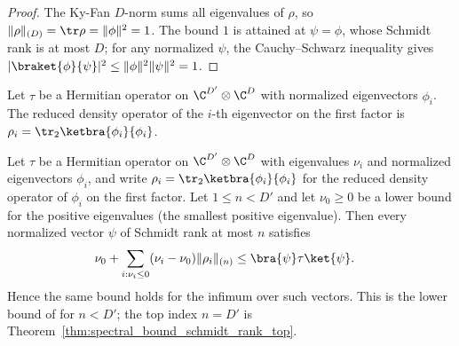 \begin{proof}
    \leanok
    The Ky-Fan $D$-norm sums all eigenvalues of $\rho$, so
    $\|\rho\|_{(D)}=\tr\rho=\|\phi\|^2=1$. The bound $1$ is attained at
    $\psi=\phi$, whose Schmidt rank is at most $D$; for any normalized
    $\psi$, the Cauchy--Schwarz inequality gives
    $|\braket{\phi}{\psi}|^2\le\|\phi\|^2\|\psi\|^2=1$.
\end{proof}

\begin{definition}
    \label{def:reduced_eig_density}
    \leanok
    Let $\tau$ be a Hermitian operator on
    $\C^{D'}\otimes\C^{D}$ with normalized eigenvectors $\phi_i$. The reduced
    density operator of the $i$-th eigenvector on the first factor is
    $\rho_i=\tr_2\ketbra{\phi_i}{\phi_i}$.
\end{definition}

\begin{theorem}
    \label{thm:spectral_lower_bound_schmidt_rank}
    \leanok
    Let $\tau$ be a Hermitian operator on $\C^{D'}\otimes\C^{D}$ with
    eigenvalues $\nu_i$ and normalized eigenvectors $\phi_i$, and write
    $\rho_i=\tr_2\ketbra{\phi_i}{\phi_i}$ for the reduced density operator of
    $\phi_i$ on the first factor. Let $1\le n<D'$ and let $\nu_0\ge 0$ be a
    lower bound for the positive eigenvalues (the smallest positive
    eigenvalue). Then every normalized vector $\psi$ of Schmidt rank at most
    $n$ satisfies
    \begin{align}
        \nu_0+\sum_{i:\nu_i\le0}
        (\nu_i-\nu_0)\|\rho_i\|_{(n)}
         & \le\bra{\psi}\tau\ket{\psi}.
        \label{eq:schwarz_spectral_schmidt_lower}
    \end{align}
    Hence the same bound holds for the infimum over such vectors. This is the
    lower bound of \cite[Chapter~3, Proposition~3.2]{Wolf2012Quantum} for
    $n<D'$; the top index $n=D'$ is
    Theorem~\ref{thm:spectral_bound_schmidt_rank_top}.
\end{theorem}


